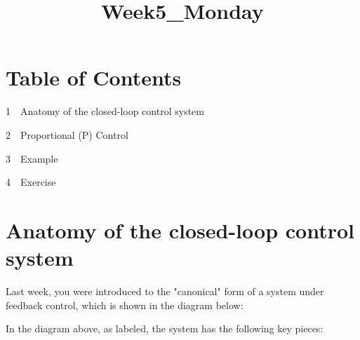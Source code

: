 \documentclass[11pt]{article}
\title{Week5\_Monday}
\begin{document}
    
    
    \maketitle
    
    

    
    \section{Table of Contents}\label{table-of-contents}

{1~~}Anatomy of the closed-loop control system

{2~~}Proportional (P) Control

{3~~}Example

{4~~}Exercise

    \section{Anatomy of the closed-loop control
system}\label{anatomy-of-the-closed-loop-control-system}

Last week, you were introduced to the "canonical" form of a system under
feedback control, which is shown in the diagram below:

    

    In the diagram above, as labeled, the system has the following key
pieces:
\end{document}
